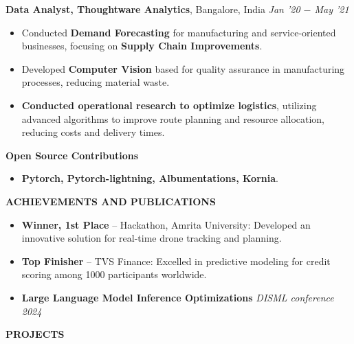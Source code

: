 \documentclass[10pt,a4]{article}
\begin{document}
{\begin{flushleft}
    \vspace{0.5mm}
    \hspace{1.5mm} \textbf{\large Data Analyst, Thoughtware Analytics},  Bangalore, India \hfill \textit{\large Jan '20 $-$ May '21}	\\
    \begin{itemize}

        \item Conducted \textbf{Demand Forecasting} for manufacturing and service-oriented businesses, focusing on \textbf{Supply Chain Improvements}.
        \item Developed \textbf{Computer Vision} based for quality assurance in manufacturing processes, reducing material waste.
        \item \textbf{Conducted operational research to optimize logistics}, utilizing advanced algorithms to improve route planning and resource allocation, reducing costs and delivery times.
    \end{itemize}

    \vspace{1.0mm}
    \hspace{1.5mm} \textbf{\large Open Source Contributions}
    \begin{itemize}
        \item \textbf{Pytorch, Pytorch-lightning, Albumentations, Kornia}.
    \end{itemize}
\end{flushleft}




\vspace{0.5mm}
\begin{flushleft}
    {\Large \textbf{ACHIEVEMENTS AND PUBLICATIONS}}
      \vspace{1.0mm}
      \begin{itemize}
            \item \textbf{Winner, 1st Place} – Hackathon, Amrita University: Developed an innovative solution for real-time drone tracking and planning.
            \item \textbf{Top Finisher} – TVS Finance: Excelled in predictive modeling for credit scoring among 1000 participants worldwide.
            \item \textbf{Large Language Model Inference Optimizations} \hfill \textit{DISML conference 2024}
      \end{itemize}
\end{flushleft}

\begin{flushleft}
    {\Large \textbf{PROJECTS}}


\end{flushleft}}
\end{document}
